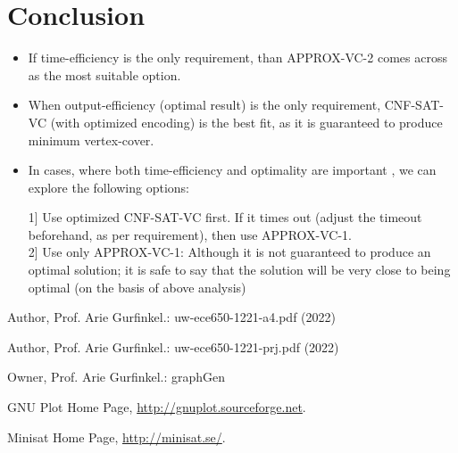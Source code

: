 \documentclass[11pt]{llncs}
\begin{document}
\section{Conclusion}
	\begin{itemize}
		\item If time-efficiency is the only requirement, than APPROX-VC-2 comes across as the most suitable option.
		\item When output-efficiency (optimal result) is the only requirement, CNF-SAT-VC (with optimized encoding) is the best fit, as it is guaranteed to produce minimum vertex-cover.\\
		\item In cases, where both time-efficiency and optimality are important , we can explore the following options:

	  		1] Use optimized CNF-SAT-VC first. If it times out (adjust the timeout beforehand, as per requirement), then use APPROX-VC-1.\\
             		2] Use only APPROX-VC-1: Although it is not guaranteed to produce an optimal solution; it is safe to say that the solution will be very close to being optimal (on the basis of above analysis)\\
	\end{itemize}


%
%
%
% 
% 
%
\begin{thebibliography}{9}
    Author, Prof. Arie Gurfinkel.: uw-ece650-1221-a4.pdf (2022)
    
    Author, Prof. Arie Gurfinkel.: uw-ece650-1221-prj.pdf (2022)
    
    Owner, Prof. Arie Gurfinkel.: graphGen
    
    GNU Plot Home Page, \url{http://gnuplot.sourceforge.net}.
    
    Minisat Home Page, \url{http://minisat.se/}.
\end{thebibliography}
\end{document}

